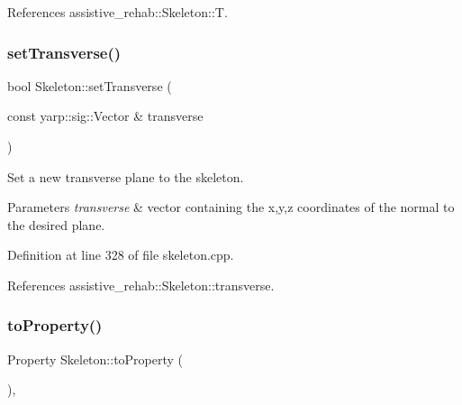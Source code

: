 References assistive\+\_\+rehab\+::\+Skeleton\+::T.

\mbox{\label{classassistive__rehab_1_1Skeleton_a1aeba05a17363afc08c30397d17375df}} 
\subsubsection{\texorpdfstring{setTransverse()}{setTransverse()}}
{\footnotesize\ttfamily bool Skeleton\+::set\+Transverse (\begin{DoxyParamCaption}\item[{const yarp\+::sig\+::\+Vector \&}]{transverse }\end{DoxyParamCaption})\hspace{0.3cm}{\ttfamily [inherited]}}



Set a new transverse plane to the skeleton. 


\begin{DoxyParams}{Parameters}
{\em transverse} & vector containing the x,y,z coordinates of the normal to the desired plane. \\
\hline
\end{DoxyParams}


Definition at line 328 of file skeleton.\+cpp.


\begin{DoxyCode}{0}

\end{DoxyCode}


References assistive\+\_\+rehab\+::\+Skeleton\+::transverse.

\mbox{\label{classassistive__rehab_1_1Skeleton_ad58ea53a165abc3f39a3c46594f0560f}} 
\subsubsection{\texorpdfstring{toProperty()}{toProperty()}}
{\footnotesize\ttfamily Property Skeleton\+::to\+Property (\begin{DoxyParamCaption}{ }\end{DoxyParamCaption})\hspace{0.3cm}{\ttfamily [virtual]}, {\ttfamily [inherited]}}



